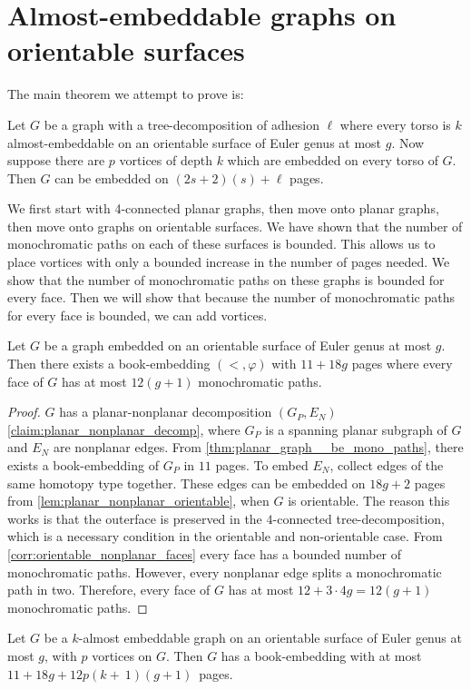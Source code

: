 \section{Almost-embeddable graphs on orientable surfaces}

The main theorem we attempt to prove is:
\begin{theorem}\label{thm:orientablevortices}
	Let $G$ be a graph with a tree-decomposition of adhesion $\ell$ where every torso is $k$ almost-embeddable on an orientable surface of Euler genus at most $g$. Now suppose there are $p$ vortices of depth $k$ which are embedded on every torso of $G$. Then $G$ can be embedded on $(2s + 2)(s) + \ell$ pages.
\end{theorem}


We first start with 4-connected planar graphs, then move onto planar graphs, then move onto graphs on orientable surfaces. We have shown that the number of monochromatic paths on each of these surfaces is bounded. This allows us to place vortices with only a bounded increase in the number of pages needed. We show that the number of monochromatic paths on these graphs is bounded for every face. Then we will show that because the number of monochromatic paths for every face is bounded, we can add vortices.

\begin{lemma}\label{lem:orientablesurfaces_monochromatic_edges}
	Let $G$ be a graph embedded on an orientable surface of Euler genus at most $g$. Then there exists a book-embedding $(<, \varphi)$ with $11 + 18g$ pages where every face of $G$ has at most $12(g + 1)$ monochromatic paths.
\end{lemma}
\begin{proof}
	$G$ has a planar-nonplanar decomposition $(G_P, E_N)$ \cref{claim:planar_nonplanar_decomp}, where $G_P$ is a spanning planar subgraph of $G$ and $E_N$ are nonplanar edges. From \cref{thm:planar_graph__be_mono_paths}, there exists a book-embedding of $G_P$ in $11$ pages. To embed $E_N$, collect edges of the same homotopy type together. These edges can be embedded on $18g+2$ pages from \cref{lem:planar_nonplanar_orientable}, when $G$ is orientable. The reason this works is that the outerface is preserved in the $4$-connected tree-decomposition, which is a necessary condition in the orientable and non-orientable case.
	From \cref{corr:orientable_nonplanar_faces} every face has a bounded number of monochromatic paths. However, every nonplanar edge splits a monochromatic path in two. Therefore, every face of $G$ has at most $12 + 3 \cdot 4g = 12(g + 1)$ monochromatic paths.
\end{proof}
\begin{lemma}\label{lem:orientablesurfaces_almostembeddable}
	Let $G$ be a $k$-almost embeddable graph on an orientable surface of Euler genus at most $g$, with $p$ vortices on $G$. Then $G$ has a book-embedding with at most $11+18g+12p(k +~1)(g + 1)$~pages.
\end{lemma}

